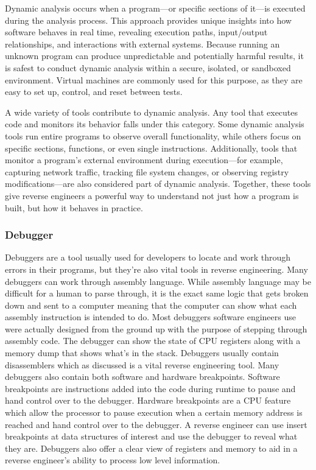 Dynamic analysis occurs when a program—or specific sections of it—is executed during the analysis process. This approach provides unique insights into how software behaves in real time, revealing execution paths, input/output relationships, and interactions with external systems. Because running an unknown program can produce unpredictable and potentially harmful results, it is safest to conduct dynamic analysis within a secure, isolated, or sandboxed environment. Virtual machines are commonly used for this purpose, as they are easy to set up, control, and reset between tests.

A wide variety of tools contribute to dynamic analysis. Any tool that executes code and monitors its behavior falls under this category. Some dynamic analysis tools run entire programs to observe overall functionality, while others focus on specific sections, functions, or even single instructions. Additionally, tools that monitor a program’s external environment during execution—for example, capturing network traffic, tracking file system changes, or observing registry modifications—are also considered part of dynamic analysis. Together, these tools give reverse engineers a powerful way to understand not just how a program is built, but how it behaves in practice.

\subsubsection{Debugger}
Debuggers are a tool usually used for developers to locate and work through errors in their programs, but they’re also vital tools in reverse engineering. 
Many debuggers can work through assembly language. 
While assembly language may be difficult for a human to parse through, it is the exact same logic that gets broken down and sent to a computer meaning that the computer can show what each assembly instruction is intended to do. 
Most debuggers software engineers use were actually designed from the ground up with the purpose of stepping through assembly code. 
The debugger can show the state of CPU registers along with a memory dump that shows what’s in the stack. 
Debuggers usually contain disassemblers which as discussed is a vital reverse engineering tool. 
Many debuggers also contain both software and hardware breakpoints. 
Software breakpoints are instructions added into the code during runtime to pause and hand control over to the debugger. 
Hardware breakpoints are a CPU feature which allow the processor to pause execution when a certain memory address is reached and hand control over to the debugger. 
A reverse engineer can use insert breakpoints at data structures of interest and use the debugger to reveal what they are. 
Debuggers also offer a clear view of registers and memory to aid in a reverse engineer's ability to process low level information.

